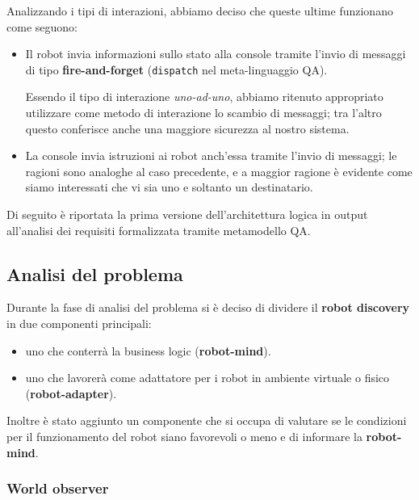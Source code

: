 Analizzando i tipi di interazioni, abbiamo deciso che queste ultime funzionano come seguono:

\begin{itemize}
  \item
    Il robot invia informazioni sullo stato alla console tramite l'invio di messaggi di tipo \textbf{fire-and-forget}
    (\texttt{dispatch} nel meta-linguaggio QA).

    Essendo il tipo di interazione \textit{uno-ad-uno}, abbiamo ritenuto appropriato utilizzare come metodo di interazione lo scambio di messaggi;
    tra l'altro questo conferisce anche una maggiore sicurezza al nostro sistema.

  \item
    La console invia istruzioni ai robot anch'essa tramite l'invio di messaggi;
    le ragioni sono analoghe al caso precedente,
    e a maggior ragione è evidente come siamo interessati che vi sia uno e soltanto un destinatario.

\end{itemize}

\clearpage

Di seguito è riportata la prima versione dell'architettura logica in output all'analisi dei requisiti formalizzata tramite metamodello QA\@.



\subsection{Analisi del problema}

Durante la fase di analisi del problema si è deciso di dividere il \textbf{robot discovery} in due componenti principali:

\begin{itemize}
  \item uno che conterrà la business logic (\textbf{robot-mind}).
  \item uno che lavorerà come adattatore per i robot in ambiente virtuale o fisico (\textbf{robot-adapter}).
\end{itemize}

Inoltre è stato aggiunto un componente che si occupa di valutare se le condizioni per il funzionamento del robot siano favorevoli o meno e di informare la \textbf{robot-mind}.

\subsubsection{World observer}

